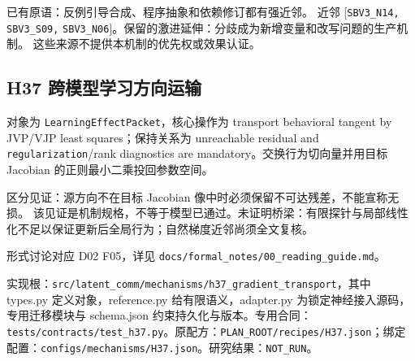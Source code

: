 \documentclass[
  10pt,
]{article}
\begin{document}
已有原语：反例引导合成、程序抽象和依赖修订都有强近邻。 近邻
{[}\nolinkurl{SBV3_N14,} \nolinkurl{SBV3_S09,}
\nolinkurl{SBV3_N06}{]}。保留的激进延伸：分歧成为新增变量和改写问题的生产机制。
这些来源不提供本机制的优先权或效果认证。

\subsection{H37
跨模型学习方向运输}\label{h37-ux8de8ux6a21ux578bux5b66ux4e60ux65b9ux5411ux8fd0ux8f93}

对象为 \nolinkurl{LearningEffectPacket}，核心操作为 transport behavioral
tangent by JVP/VJP least squares；保持关系为 unreachable residual and
\nolinkurl{regularization}/rank diagnostics are
mandatory。交换行为切向量并用目标 Jacobian 的正则最小二乘投回参数空间。

区分见证：源方向不在目标 Jacobian
像中时必须保留不可达残差，不能宣称无损。
该见证是机制规格，不等于模型已通过。未证明桥梁：有限探针与局部线性化不足以保证更新后全局行为；自然梯度近邻尚须全文复核。

形式讨论对应 D02 F05，详见
{\small\nolinkurl{docs/formal_notes/00_reading_guide.md}}。

实现根：{\small\nolinkurl{src/latent_comm/mechanisms/h37_gradient_transport}}，其中
types.py 定义对象，reference.py 给有限语义，adapter.py
为锁定神经接入源码，专用迁移模块与 schema.json
约束持久化与版本。专用合同：{\small\nolinkurl{tests/contracts/test_h37.py}}。原配方：{\small\nolinkurl{PLAN_ROOT/recipes/H37.json}}；绑定配置：{\small\nolinkurl{configs/mechanisms/H37.json}}。研究结果：\nolinkurl{NOT_RUN}。
\end{document}
